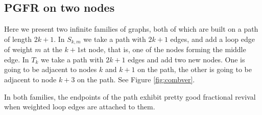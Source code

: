 \subsection{PGFR on two nodes}

Here we present two infinite families of graphs, both of which are built on a path of length $2k+1$. In $S_{k,m}$ we take a path with $2k+1$ edges, and add a loop edge of weight $m$ at the $k+1$st node, that is, one of the nodes forming the middle edge. In $T_k$ we take a path with $2k+1$ edges and add two new nodes. One is going to be adjacent to nodes $k$ and $k+1$ on the path, the other is going to be adjacent to node $k+3$ on the path. See Figure \ref{fig:combver}.

In both families, the endpoints of the path exhibit pretty good fractional revival when weighted loop edges are attached to them.

